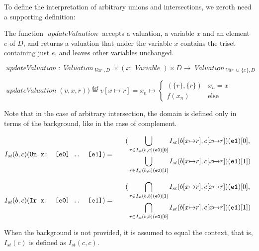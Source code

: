 \documentclass[oneside,12pt]{book}
\theoremstyle{definition}
\theoremstyle{remark}
\newcommand\var[1]{\mathop{\mathit{#1}}\nolimits}
\newcommand{\st}{\var{st}}
\newcommand{\Var}{\var{Var}}
\newcommand{\updateValuation}{\var{updateValuation}}
\newcommand{\defeq}{\stackrel{\text{def}}{=}}
\newcommand{\Variable}{\var{Variable}}
\newcommand{\Valuation}{\var{Valuation}}
\begin{document}
To define the interpretation of arbitrary unions and intersections, we zeroth
need a supporting definition:

The function $\updateValuation$  accepts a valuation, a variable $x$ and an element
$e$ of $D$, and returns a valuation that under the variable $x$ contains the triset
containing just $e$, and leaves other variables unchanged.

\begin{defBox}
  $\updateValuation\colon
    \Valuation_{\Var,D} \times (x\colon \Variable) \times D
      \to \Valuation_{\Var \cup\,\{x\},D}$
  
  \medskip \noindent
  $\updateValuation(v, x, r)) \defeq v[x \mapsto r] = x_n \mapsto \begin{cases}
  (\{r\},\{r\}) & x_n = x\\
  f(x_n) & \text{else}
  \end{cases}$
\end{defBox}

Note that in the case of arbitrary intersection, the domain is defined only
in terms of the background, like in the case of complement.

\begin{defBox}
  $I_{\st}(b,c)(\texttt{Un x: [e0] .. [e1]}) = \\*
    \phantom{aaa} \begin{aligned}
    (&\bigcup_{r \in I_{\st}(b,c)(\texttt{e0})[0]}
    I_{\st}(b[x {\mapsto} r], c[x {\mapsto} r])(\texttt{e1})[0],\\*
    &\bigcup_{r \in I_{\st}(b,c)(\texttt{e0})[1]}
    I_{\st}(b[x {\mapsto} r], c[x {\mapsto} r])(\texttt{e1})[1])
    \end{aligned}$
  
  \bigskip \noindent $I_{\st}(b,c)(\texttt{Ir x: [e0] .. [e1]}) = \\*
    \phantom{aaa} \begin{aligned}
    (&\bigcap_{r \in I_{\st}(b,b)(\texttt{e0})[1]}
    I_{\st}(b[x {\mapsto} r], c[x {\mapsto} r])(\texttt{e1})[0],\\*
    &\bigcap_{r \in I_{\st}(b,b)(\texttt{e0})[0]}
    I_{\st}(b[x {\mapsto} r], c[x {\mapsto} r])(\texttt{e1})[1])
    \end{aligned}$
  
  \bigskip \noindent When the background is not provided, it is assumed to
  equal the context, that is, $I_{\st}(c)$ is defined as $I_{\st}(c, c)$.
\end{defBox}
\end{document}
